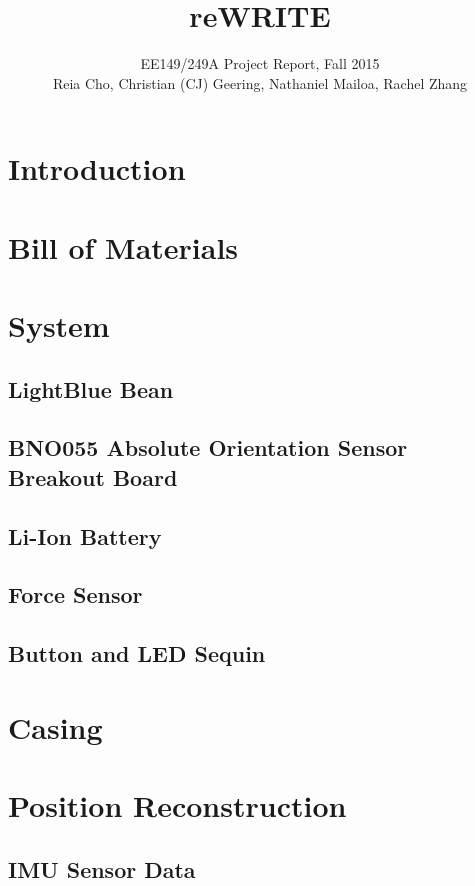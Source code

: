 \documentclass[12pt,journal]{IEEEtran}
\begin{document}
\title{reWRITE}

\author{EE149/249A Project Report, Fall 2015

Reia Cho, Christian (CJ) Geering, Nathaniel Mailoa, Rachel Zhang}


\maketitle

\section{Introduction}


\section{Bill of Materials}


\section{System}
\subsection{LightBlue Bean}
\subsection{BNO055 Absolute Orientation Sensor Breakout Board}
\subsection{Li-Ion Battery}
\subsection{Force Sensor}
\subsection{Button and LED Sequin}

\section{Casing}

\section{Position Reconstruction}
\subsection{IMU Sensor Data}
\end{document}
